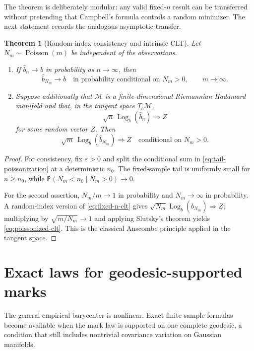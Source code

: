 \documentclass[11pt,a4paper]{article}
\newtheorem{theorem}{Theorem}[section]
\theoremstyle{remark}
\newcommand{\M}{\mathcal M}
\newcommand{\PP}{\mathbb P}
\newcommand{\Log}{\operatorname{Log}}
\begin{document}
The theorem is deliberately modular: any valid fixed-\(n\) result can be transferred without pretending that Campbell's formula controls a random minimizer.  The next statement records the analogous asymptotic transfer.

\begin{theorem}[Random-index consistency and intrinsic CLT]
\label{thm:random-index-clt}
Let \(N_m\sim\operatorname{Poisson}(m)\) be independent of the observations.
\begin{enumerate}[label=(\roman*)]
\item If \(\widehat b_n\to b\) in probability as \(n\to\infty\), then
\[
 \widehat b_{N_m}\to b
 \quad\text{in probability conditional on }N_m>0,
 \qquad m\to\infty.
\]
\item Suppose additionally that \(\M\) is a finite-dimensional Riemannian Hadamard manifold and that, in the tangent space \(T_b\M\),
\begin{equation}
\label{eq:fixed-n-clt}
 \sqrt n\,\Log_b(\widehat b_n)\Rightarrow Z
\end{equation}
for some random vector \(Z\).  Then
\begin{equation}
\label{eq:poissonized-clt}
 \sqrt m\,\Log_b(\widehat b_{N_m})\Rightarrow Z
 \quad\text{conditional on }N_m>0.
\end{equation}
\end{enumerate}
\end{theorem}

\begin{proof}
For consistency, fix \(\varepsilon>0\) and split the conditional sum in \eqref{eq:tail-poissonization} at a deterministic \(n_0\).  The fixed-sample tail is uniformly small for \(n\ge n_0\), while \(\PP(N_m<n_0\mid N_m>0)\to0\).

For the second assertion, \(N_m/m\to1\) in probability and \(N_m\to\infty\) in probability.  A random-index version of \eqref{eq:fixed-n-clt} gives
\(\sqrt{N_m}\Log_b(\widehat b_{N_m})\Rightarrow Z\); multiplying by \(\sqrt{m/N_m}\to1\) and applying Slutsky's theorem yields \eqref{eq:poissonized-clt}.  This is the classical Anscombe principle \cite{anscombe1952} applied in the tangent space.
\end{proof}

\section{Exact laws for geodesic-supported marks}
\label{sec:geodesic}

The general empirical barycenter is nonlinear.  Exact finite-sample formulas become available when the mark law is supported on one complete geodesic, a condition that still includes nontrivial covariance variation on Gaussian manifolds.
\end{document}
